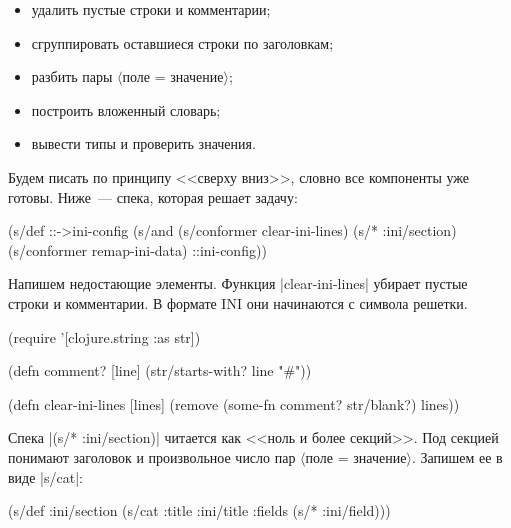 \begin{itemize}

\item
  удалить пустые строки и комментарии;

\item
  сгруппировать оставшиеся строки по заголовкам;

\item
  разбить пары $\langle$поле = значение$\rangle$;

\item
  построить вложенный словарь;

\item
  вывести типы и проверить значения.

\end{itemize}

Будем писать по принципу <<сверху вниз>>, словно все компоненты уже
готовы. Ниже~--- спека, которая решает задачу:

\begin{english}
  \begin{clojure}
(s/def ::->ini-config
  (s/and
   (s/conformer clear-ini-lines)
   (s/* :ini/section)
   (s/conformer remap-ini-data)
   ::ini-config))
  \end{clojure}
\end{english}

Напишем недостающие элементы. Функция \spverb|clear-ini-lines| убирает пустые
строки и комментарии. В формате INI они начинаются с символа решетки.

\begin{english}
  \begin{clojure}
(require '[clojure.string :as str])

(defn comment? [line]
  (str/starts-with? line "#"))

(defn clear-ini-lines [lines]
  (remove (some-fn comment? str/blank?) lines))
  \end{clojure}
\end{english}

Спека \spverb|(s/* :ini/section)| читается как <<ноль и более секций>>. Под
секцией понимают заголовок и произвольное число пар $\langle$поле =
значение$\rangle$. Запишем ее в виде \spverb|s/cat|:

\begin{english}
  \begin{clojure}
(s/def :ini/section
  (s/cat :title :ini/title :fields (s/* :ini/field)))
  \end{clojure}
\end{english}

